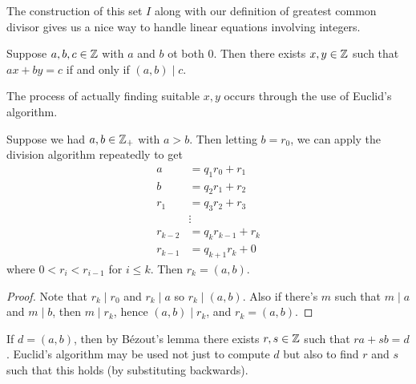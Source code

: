 \documentclass[a4paper]{scrartcl}
\begin{document}
The construction of this set $I$ along with our definition of greatest common divisor gives us a nice way to handle linear equations involving integers.

\begin{corollary}
  Suppose $a, b, c \in \mathbb{Z}$ with $a$ and $b$ ot both $0$. Then there exists $x, y \in \mathbb{Z}$ such that $ax + by = c$ if and only if $(a, b) \mid c$.
\end{corollary}

The process of actually finding suitable $x, y$ occurs through the use of Euclid's algorithm.

\begin{theorem}
Suppose we had $a, b \in \mathbb{Z}_+$ with $a > b$. Then letting $b = r_0$, we can apply the division algorithm repeatedly to get
\begin{align*}
  a &= q_1 r_0 + r_1 \\
  b &= q_2 r_1 + r_2 \\
  r_1 &= q_3 r_2 + r_3 \\
  &\vdots \\
  r_{k - 2} &= q_k r_{k - 1} + r_k \\
  r_{k - 1} &= q_{k + 1}r_k + 0
\end{align*}
where $0 < r_i < r_{i - 1}$ for $i \leq k$. Then $r_k = (a, b)$.
\end{theorem}
\begin{proof}
  Note that $r_k \mid r_0$ and $r_k \mid a$ so $r_k \mid (a, b)$. Also if there's $m$ such that $m \mid a$ and $m \mid b$, then $m \mid r_k$, hence $(a, b) \mid r_k$, and $r_k = (a, b)$.
\end{proof}

If $d = (a, b)$, then by Bézout's lemma there exists $r, s \in \mathbb{Z}$ such that $ra + sb = d$. Euclid's algorithm may be used not just to compute $d$ but also to find $r$ and $s$ such that this holds (by substituting backwards).

\end{document}
